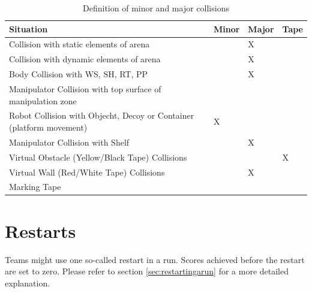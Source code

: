\begin{table}[h!]
	\caption{Definition of minor and major collisions}
	\label{tab:collisions}
	\centering
	\begin{tabular}{|p{10cm}|p{1cm}|p{1cm}|p{1.5cm}|}
		\hline
		Situation                                                & Minor & Major &  Tape \\
		\hline
		Collision with static elements of arena                  &       & X     &              \\
		Collision with dynamic elements of arena                 &       & X     &              \\
		Body Collision with WS, SH, RT, PP                     &       & X     &              \\
		Manipulator Collision with top surface of manipulation zone       &       &       &              \\
		Robot Collision with Objecht, Decoy or Container (platform movement)    &  X     &       &              \\

		Manipulator Collision with Shelf                   &      & X      &              \\
		Virtual Obstacle (Yellow/Black Tape) Collisions          &       &       & X            \\
		Virtual Wall (Red/White Tape) Collisions                 &       & X     &              \\
		Marking Tape & & & \\
		\hline
	\end{tabular}
\end{table}


\section{Restarts}
Teams might use one so-called restart in a run. Scores achieved before the restart are set to zero. Please refer to section \ref{sec:restartingarun} for a more detailed explanation.


